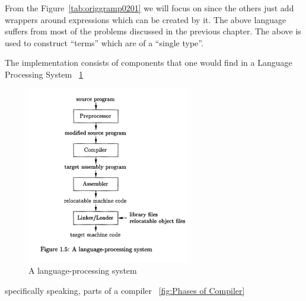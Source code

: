 \documentclass[thesis-solanki.tex]{subfiles}
\begin{document}
From the Figure~\ref{tab:origgramp0201} we will focus on   since the others just add wrappers around expressions which can
be created by it. The above language suffers from most of the problems discussed in the previous chapter. The above is used to construct
 ``terms'' which are of a ``single type''.


The implementation consists of components that one would find in a Language Processing System ~\ref{fig:A language-processing system}\yyy{,}{),}

\begin{figure}[th]
\centering
\includegraphics[scale = .95]{Language_Processing_System.png}
\caption{A language-processing system  \cite{Aho:1986:CPT:6448}\yyy{}{)}}
\label{fig:A language-processing system}
\end{figure}

specifically speaking, parts of a compiler ~\ref{fig:Phases of Compiler}
\end{document}
